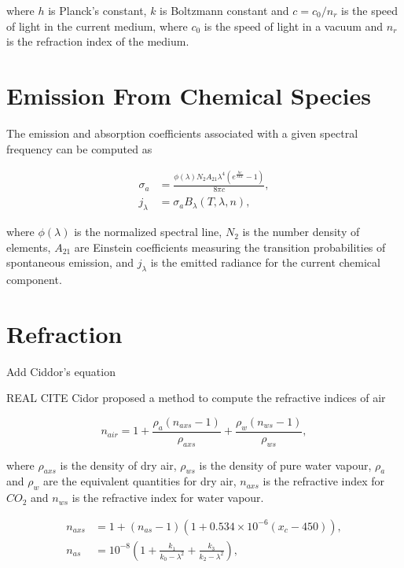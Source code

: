 where $h$ is Planck's constant, $k$ is Boltzmann constant and $c =  c_0 / n_r$ is the speed of light in the current medium, where $c_0$ is the speed of light in a vacuum and $n_r$ is the refraction index of the medium.

\section{Emission From Chemical Species}
\label{sec:emission_from_chemical_species}

The emission and absorption coefficients associated with a given spectral frequency can be computed as


\begin{align}
\sigma_a &= \frac{\phi(\lambda) N_2 A_{21} \lambda^4 (e ^\frac{h c}{\lambda k T} - 1)}{8 \pi c}, \\
j_\lambda &= \sigma_a B_\lambda (T, \lambda, n), 
\end{align}

where $\phi(\lambda)$ is the normalized spectral line, $N_2$ is the number density of elements, $A_{21}$ are Einstein coefficients measuring the transition probabilities of spontaneous emission, and $j_\lambda$ is the emitted radiance for the current chemical component.

\section{Refraction}
\label{sec:refraction}

Add Ciddor's equation

REAL CITE Cidor proposed a method to compute the refractive indices of air 

\begin{equation}
n_{air} = 1 + \frac{\rho_a( n_{axs} - 1)}{\rho_{axs}} + \frac{\rho_w( n_{ws} - 1)}{\rho_{ws}},
\end{equation}

where $\rho_{axs}$ is the density of dry air, $\rho_{ws}$ is the density of pure water vapour, $\rho_{a}$ and $\rho_{w}$ are the equivalent quantities for dry air, $n_{axs}$ is the refractive index for $CO_2$ and $n_{ws}$ is the refractive index for water vapour. 

\begin{align}
n_{axs} &= 1 + (n_{as} - 1)(1 + 0.534 \times 10^{-6} (x_c - 450)), \\
n_{as} &= 10^{-8} \left( 1 + \frac{k_1}{k_0 - \lambda^2} + \frac{k_3}{k_2 - \lambda^2} \right),
\end{align}


